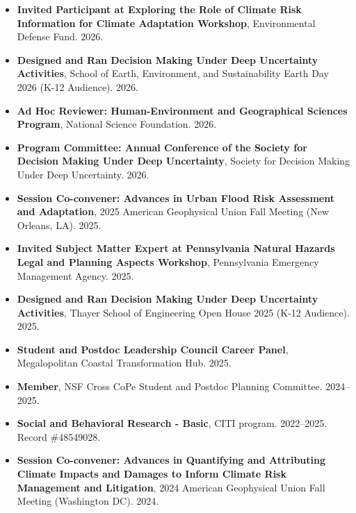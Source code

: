 \documentclass[10pt,oneside]{article}
\begin{document}
\begin{itemize}[label={}]
  
  \item \textbf{Invited Participant at Exploring the Role of Climate Risk Information for Climate Adaptation Workshop}, Environmental Defense Fund. 2026.
  
  \item \textbf{Designed and Ran Decision Making Under Deep Uncertainty Activities}, School of Earth, Environment, and Sustainability Earth Day 2026 (K-12 Audience). 2026.
  
  \item \textbf{Ad Hoc Reviewer: Human-Environment and Geographical Sciences Program}, National Science Foundation. 2026.
  
  \item \textbf{Program Committee: Annual Conference of the Society for Decision Making Under Deep Uncertainty}, Society for Decision Making Under Deep Uncertainty. 2026.
  
  \item \textbf{Session Co-convener: Advances in Urban Flood Risk Assessment and Adaptation}, 2025 American Geophysical Union Fall Meeting (New Orleans, LA). 2025.
  
  \item \textbf{Invited Subject Matter Expert at Pennsylvania Natural Hazards Legal and Planning Aspects Workshop}, Pennsylvania Emergency Management Agency. 2025.
  
  \item \textbf{Designed and Ran Decision Making Under Deep Uncertainty Activities}, Thayer School of Engineering Open House 2025 (K-12 Audience). 2025.
  
  \item \textbf{Student and Postdoc Leadership Council Career Panel}, Megalopolitan Coastal Transformation Hub. 2025.
  
  \item \textbf{Member}, NSF Cross CoPe Student and Postdoc Planning Committee. 2024--2025.
  
  \item \textbf{Social and Behavioral Research - Basic}, CITI program. 2022--2025.\\Record \#48549028.
  
  \item \textbf{Session Co-convener: Advances in Quantifying and Attributing Climate Impacts and Damages to Inform Climate Risk Management and Litigation}, 2024 American Geophysical Union Fall Meeting (Washington DC). 2024.
  

\end{itemize}
\end{document}
